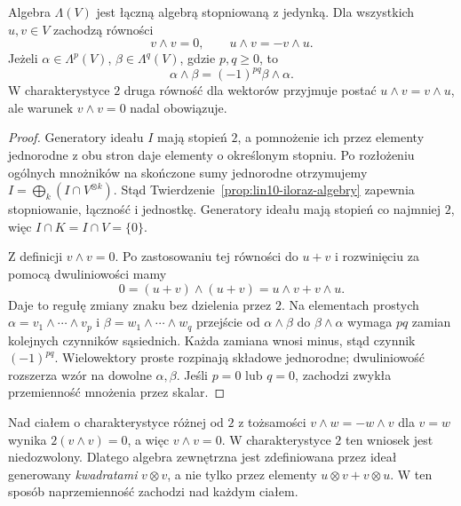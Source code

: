 \begin{stwierdzenie}
\label{prop:lin10-wedge-znaki}
Algebra \(\Lambda(V)\) jest łączną
algebrą stopniowaną z jedynką.
Dla wszystkich \(u,v\in V\)
zachodzą równości
\[
 v\wedge v=0,\qquad
 u\wedge v=-v\wedge u.
\]
Jeżeli \(\alpha\in\Lambda^p(V)\),
\(\beta\in\Lambda^q(V)\), gdzie
\(p,q\geq0\), to
\[
 \alpha\wedge\beta
 =(-1)^{pq}\beta\wedge\alpha.
\]
W charakterystyce \(2\)
druga równość dla wektorów
przyjmuje postać
\(u\wedge v=v\wedge u\), ale
warunek \(v\wedge v=0\)
nadal obowiązuje.
\end{stwierdzenie}
\begin{proof}
Generatory ideału \(I\) mają
stopień \(2\), a pomnożenie
ich przez elementy jednorodne
z obu stron daje elementy
o określonym stopniu.
Po rozłożeniu ogólnych
mnożników na skończone sumy
jednorodne otrzymujemy
\(I=\bigoplus_k(I\cap V^{\otimes k})\).
Stąd
Twierdzenie~\ref{prop:lin10-iloraz-algebry}
zapewnia stopniowanie,
łączność i jednostkę.
Generatory ideału mają stopień
co najmniej \(2\), więc
\(I\cap K=I\cap V=\{0\}\).

Z definicji \(v\wedge v=0\).
Po zastosowaniu tej równości
do \(u+v\) i rozwinięciu
za pomocą dwuliniowości mamy
\[
 0=(u+v)\wedge(u+v)
  =u\wedge v+v\wedge u.
\]
Daje to regułę zmiany znaku
bez dzielenia przez \(2\).
Na elementach prostych
\(\alpha=v_1\wedge\cdots\wedge v_p\)
i \(\beta=w_1\wedge\cdots\wedge w_q\)
przejście od \(\alpha\wedge\beta\)
do \(\beta\wedge\alpha\) wymaga
\(pq\) zamian kolejnych
czynników sąsiednich.
Każda zamiana wnosi minus,
stąd czynnik \((-1)^{pq}\).
Wielowektory proste rozpinają
składowe jednorodne; dwuliniowość
rozszerza wzór na dowolne
\(\alpha,\beta\).
Jeśli \(p=0\) lub \(q=0\),
zachodzi zwykła przemienność
mnożenia przez skalar.
\end{proof}

\begin{uwaga}
\label{rem:lin10-char2}
Nad ciałem o charakterystyce
różnej od \(2\) z tożsamości
\(v\wedge w=-w\wedge v\)
dla \(v=w\) wynika
\(2(v\wedge v)=0\), a więc
\(v\wedge v=0\).
W charakterystyce \(2\)
ten wniosek jest niedozwolony.
Dlatego algebra zewnętrzna
jest zdefiniowana przez ideał
generowany \emph{kwadratami}
\(v\otimes v\), a nie tylko
przez elementy
\(u\otimes v+v\otimes u\).
W ten sposób naprzemienność
zachodzi nad każdym ciałem.
\end{uwaga}

